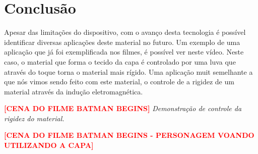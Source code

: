 \section{Conclusão}
Apesar das limitações do dispositivo, com o avanço desta tecnologia é possível identificar diversas aplicações deste material no futuro. Um exemplo de uma aplicação que já foi exemplificada nos filmes, é possível ver neste vídeo. Neste caso, o material que forma o tecido da capa é controlado por uma luva que através do toque torna o material mais rígido. Uma aplicação muit semelhante a que nós vimos sendo feito com este material, o controle de a rigidez de um material através da indução eletromagnética.

\begin{center}
    \textcolor{red}{\textbf{[CENA DO FILME BATMAN BEGINS]}}
    \textit{Demonstração de controle da rigidez do material.}
\end{center}

\begin{center}
    \textcolor{red}{\textbf{[CENA DO FILME BATMAN BEGINS -  PERSONAGEM VOANDO UTILIZANDO A CAPA]}}
\end{center}
        